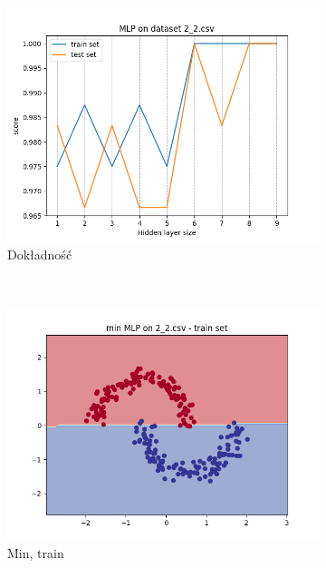 \documentclass[12pt]{article}
\newcommand*{\subfigwidth}{0.24\textwidth}
\begin{document}
\begin{figure}[H]\centering
    \begin{subfigure}[t]{\subfigwidth}
        \includegraphics[width=\linewidth]{img/exp_2/mlp/2_2/accuracy.png}
        \caption{Dokładność}
    \end{subfigure}
    \\
    \begin{subfigure}[t]{\subfigwidth}
        \includegraphics[width=\linewidth]{img/exp_2/mlp/2_2/min/train_boundary.png}
        \caption{Min, train}
    \end{subfigure}
    \hfill
    \begin{subfigure}[t]{\subfigwidth}

\end{subfigure}
\end{figure}
\end{document}
